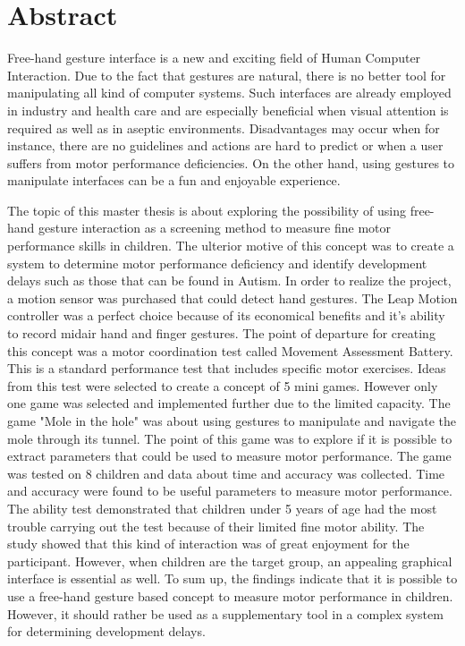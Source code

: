 \chapter*{Abstract}




Free-hand gesture interface is a new and exciting field of Human Computer Interaction. Due to the fact that gestures are natural, there is no better tool for manipulating all kind of computer systems. Such interfaces are already employed in industry and health care and are especially beneficial when visual attention is required as well as in aseptic environments. Disadvantages may occur when for instance, there are no guidelines and actions are hard to predict or when a user suffers from motor performance deficiencies. On the other hand, using gestures to manipulate interfaces can be a fun and enjoyable experience. 

The topic of this master thesis is about exploring the possibility of using free-hand gesture interaction as a screening method to measure fine motor performance skills in children. The ulterior motive of this concept was to create a system to determine motor performance deficiency and identify development delays such as those that can be found in Autism.
In order to realize the project, a motion sensor was purchased that could detect hand gestures. The Leap Motion controller was a perfect choice because of its economical benefits and it's ability to record midair hand and finger gestures. The point of departure for creating this concept was a motor coordination test called Movement Assessment Battery. This is a standard performance test that includes specific motor exercises. Ideas from this test were selected to create a concept of 5 mini games. However only one game was selected and implemented further due to the limited capacity. The game "Mole in the hole" was about using gestures to manipulate and navigate the mole through its tunnel. The point of this game was to explore if it is possible to extract parameters that could be used to measure motor performance. The game was tested on 8 children and data about time and accuracy was collected. Time and accuracy were found to be useful parameters to measure motor performance. The ability test demonstrated that children under 5 years of age had the most trouble carrying out the test because of their limited fine motor ability. 
The study showed that this kind of interaction was of great enjoyment for the participant. However, when children are the target group, an appealing graphical interface is essential as well.  
To sum up, the findings indicate that it is possible to use a free-hand gesture based concept to measure motor performance in children. However, it should rather be used as a supplementary tool in a complex system for determining development delays.\\

